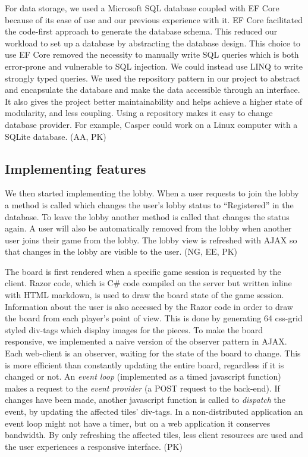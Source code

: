 \documentclass[acmlarge, review=false, screen=true]{acmart}
\begin{document}
    For data storage, we used a Microsoft SQL database coupled with EF Core because of its ease of use and our previous experience with it. EF Core facilitated the code-first approach to generate the database schema. This reduced our workload to set up a database by abstracting the database design. This choice to use EF Core removed the necessity to manually write SQL queries which is both error-prone and vulnerable to SQL injection. We could instead use LINQ to write strongly typed queries. We used the repository pattern in our project to abstract and encapsulate the database and make the data accessible through an interface. It also gives the project better maintainability and helps achieve a higher state of modularity, and less coupling. Using a repository makes it easy to change database provider. For example, Casper could work on a Linux computer with a SQLite database. (AA, PK)


  \subsection{Implementing features}
    We then started implementing the lobby. When a user requests to join the lobby a method is called which changes the user's lobby status to “Registered” in the database. To leave the lobby another method is called that changes the status again. A user will also be automatically removed from the lobby when another user joins their game from the lobby. The lobby view is refreshed with AJAX so that changes in the lobby are visible to the user. (NG, EE, PK)

    The board is first rendered when a specific game session is requested by the client. Razor code, which is C\# code compiled on the server but written inline with HTML markdown, is used to draw the board state of the game session\cite{razor}. Information about the user is also accessed by the Razor code in order to draw the board from each player's point of view. This is done by generating 64 css-grid styled div-tags which display images for the pieces. To make the board responsive, we implemented a naive version of the observer pattern in AJAX\cite{ajax}. Each web-client is an observer, waiting for the state of the board to change. This is more efficient than constantly updating the entire board, regardless if it is changed or not. An \textit{event loop} (implemented as a timed javascript function) makes a request to the \textit{event provider} (a POST request to the back-end)\cite{event-loop}. If changes have been made, another javascript function is called to \textit{dispatch} the event, by updating the affected tiles’ div-tags. In a non-distributed application an event loop might not have a timer, but on a web application it conserves bandwidth. By only refreshing the affected tiles, less client resources are used and the user experiences a responsive interface. (PK)
\end{document}
